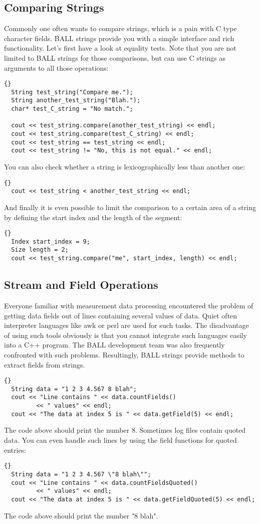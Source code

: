 \subsection{Comparing Strings}

Commonly one often wants to compare strings, which is a pain with C type
character fields. BALL strings provide you with a simple interface and rich
functionality. Let's first have a look at equality tests. Note that you are
not limited to BALL strings for those comparisons, but can use C strings
as arguments to all those operations:
\begin{lstlisting}{}
  String test_string("Compare me.");
  String another_test_string("Blah.");
  char* test_C_string = "No match.";

  cout << test_string.compare(another_test_string) << endl;
  cout << test_string.compare(test_C_string) << endl;
  cout << test_string == test_string << endl;
  cout << test_string != "No, this is not equal." << endl;
\end{lstlisting}
You can also check whether a string is lexicographically less than another
one:
\begin{lstlisting}{}
  cout << test_string < another_test_string << endl;
\end{lstlisting}
And finally it is even possible to limit the comparison to a certain area of
a string by defining the start index and the length of the segment:
\begin{lstlisting}{}
  Index start_index = 9;
  Size length = 2;
  cout << test_string.compare("me", start_index, length) << endl;
\end{lstlisting}

\subsection{Stream and Field Operations}

Everyone familiar with measurement data processing encountered the problem of
getting data fields out of lines containing several values of data. Quiet
often interpreter languages like awk or perl are used for such tasks. The
disadvantage of using such tools obviously is that you cannot integrate such
languages easily into a C++ program. The BALL development team was also
frequently confronted with such problems. Resultingly, BALL strings provide
methods to extract fields from strings.
\begin{lstlisting}{}
  String data = "1 2 3 4.567 8 blah";
  cout << "Line contains " << data.countFields() 
		 << " values" << endl;
  cout << "The data at index 5 is " << data.getField(5) << endl;
\end{lstlisting}
The code above should print the number 8.
Sometimes log files contain quoted data. You can even handle such lines by
using the field functions for quoted entries:
\begin{lstlisting}{}
  String data = "1 2 3 4.567 \"8 blah\"";
  cout << "Line contains " << data.countFieldsQuoted() 
		 << " values" << endl;
  cout << "The data at index 5 is " << data.getFieldQuoted(5) << endl;
\end{lstlisting}
The code above should print the number "8 blah".

